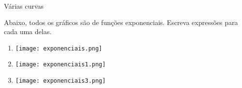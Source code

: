 


\clearpage
\begin{task}{Várias curvas}

Abaixo, todos os gráficos são de funções exponenciais. Escreva expressões para cada uma delas.

\begin{enumerate}

\item{}
{
\texttt{[image: exponenciais.png]}
}


\item{}

{
\texttt{[image: exponenciais1.png]}
}


\item{}

{
\texttt{[image: exponenciais3.png]}
}


\end{enumerate}

\end{task}




